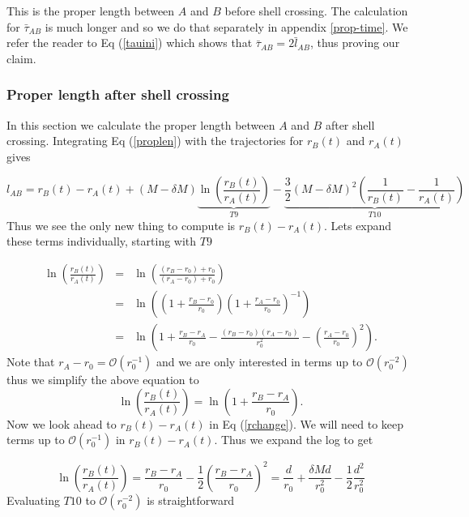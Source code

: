 \documentclass[aps,showpacs,onecolumn,floats,prd,superscriptaddress,nofootinbib]{revtex4-1}
\begin{document}
This is the proper length between $A$ and $B$ before shell crossing. 
The calculation for $\bar{\tau}_{AB}$ is much longer and so we do that separately in appendix \ref{prop-time}.   We refer the reader to Eq (\ref{tauini}) which shows that $\bar{\tau}_{AB} = 2 \bar{l}_{AB}$, thus proving our claim.  

\subsubsection{Proper length after shell crossing}

In this section we calculate the proper length between $A$ and $B$ after shell crossing. Integrating Eq (\ref{proplen}) with the trajectories for $r_B(t)$ and $r_A(t)$ gives 

\begin{equation}
	l_{AB} = r_B(t) - r_A(t) + (M - \delta M) \underbrace{\ln \left( \frac{r_B(t)}{r_A(t)} \right)}_{T9} - \underbrace{\frac{3}{2} (M - \delta M)^2 \left( \frac{1}{r_B(t)} - \frac{1}{r_A(t)} \right)}_{T10}
\end{equation}
Thus we see the only new thing to compute is $r_B(t) - r_A(t)$. Lets expand these terms individually, starting with $T9$

\begin{eqnarray}
	\ln \left( \frac{r_B(t)}{r_A(t)} \right) & = & \ln \left( \frac{(r_B - r_0) + r_0}{(r_A - r_0) + r_0} \right)	\nonumber	\\
	& = & \ln \left( \left( 1 + \frac{r_B - r_0}{r_0} \right) \left( 1 + \frac{r_A - r_0}{r_0} \right)^{-1} \right)	\nonumber	\\
	& = & \ln \left( 1 + \frac{r_B - r_A}{r_0} - \frac{(r_B - r_0)(r_A - r_0)}{r_0^2} - \left( \frac{r_A - r_0}{r_0} \right)^2 \right).
\end{eqnarray}
Note that $r_A - r_0 = \mathcal{O}(r_0^{-1})$ and we are only interested in terms up to $\mathcal{O}(r_0^{-2})$ thus we simplify the above equation to 
\begin{equation}
	\ln \left( \frac{r_B(t)}{r_A(t)} \right) = \ln \left( 1 + \frac{r_B - r_A}{r_0} \right).
\end{equation}
Now we look ahead to $r_B(t) - r_A(t)$ in Eq (\ref{rchange}). We will need to keep terms up to $\mathcal{O}(r_0^{-1})$ in $r_B(t) - r_A(t)$. Thus we expand the log to get

\begin{equation}
	\ln \left( \frac{r_B(t)}{r_A(t)} \right) = \frac{r_B - r_A}{r_0} - \frac{1}{2} \left( \frac{r_B - r_A}{r_0} \right)^2 = \frac{d}{r_0} + \frac{\delta M d}{r_0^2} - \frac{1}{2} \frac{d^2}{r_0^2} 
\end{equation}
Evaluating $T10$ to $\mathcal{O}(r_0^{-2})$ is straightforward
\end{document}
